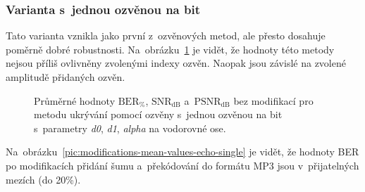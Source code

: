 \subsubsection*{Varianta s~jednou ozvěnou na bit}

Tato varianta vznikla jako první z~ozvěnových metod, ale přesto dosahuje
poměrně dobré robustnosti.
Na~obrázku~\ref{pic:no-mod-params-mean-values-echo-single} je vidět, že hodnoty
této metody nejsou příliš ovlivněny zvolenými indexy ozvěn. Naopak jsou závislé
na zvolené amplitudě přidaných ozvěn.

\begin{figure}[H]
    \table
    \centering
    \caption{Průměrné hodnoty $\mathrm{BER}_{\%}$, $\mathrm{SNR}_\mathrm{dB}$
    a~$\mathrm{PSNR}_\mathrm{dB}$ bez modifikací pro metodu ukrývání pomocí
    ozvěny s~jednou ozvěnou na bit s~parametry \textit{d0}, \textit{d1},
    \textit{alpha} na vodorovné ose.}
    \label{pic:no-mod-params-mean-values-echo-single}
\end{figure}

Na~obrázku~\ref{pic:modifications-mean-values-echo-single} je vidět, že hodnoty
BER po modifikacích přidání šumu a~překódování do formátu MP3 jsou
v~přijatelných mezích (do 20\%).

